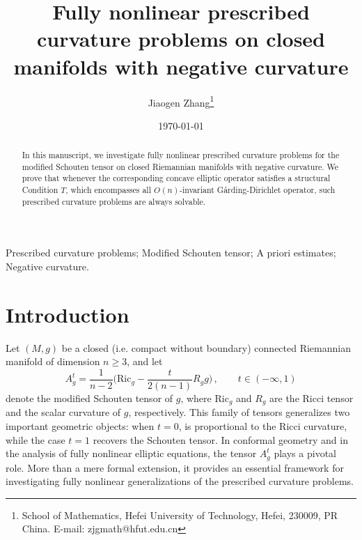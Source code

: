 \documentclass{article}
\providecommand{\keywords}[1]
{
\textbf{\text{Keywords: }} #1
}
\theoremstyle{plain}
\theoremstyle{definition}
\theoremstyle{definition}
\numberwithin{equation}{section}
\begin{document}
\begin{sloppypar}	
\title{Fully nonlinear prescribed curvature problems on closed manifolds with negative curvature}
	
\author{
Jiaogen Zhang\thanks{School of Mathematics,  Hefei University of Technology,  Hefei, 230009, PR China. E-mail: zjgmath@hfut.edu.cn} 
}


\date{\today}
\maketitle


\begin{abstract}
In this manuscript, we  investigate fully nonlinear prescribed curvature problems for the modified Schouten tensor on closed Riemannian manifolds with negative curvature. We prove that whenever the corresponding concave elliptic operator satisfies a structural Condition $T$, which encompasses all $O(n)$-invariant G\r{a}rding-Dirichlet operator, such prescribed curvature problems are always solvable.
\end{abstract}


\keywords{Prescribed curvature problems; Modified Schouten tensor; A priori estimates; Negative curvature.}



\section{Introduction}
Let $(M,g)$ be a closed (i.e. compact without boundary) connected Riemannian manifold of dimension $n \geq 3$, and let
\[
A^{t}_{g}=\frac{1}{n-2}\big( \mathrm{Ric}_{g}-\frac{t}{2(n-1)}R_{g}g\big)\,, \qquad t\in (-\infty,1)
\]
denote the modified Schouten tensor of $g$, where $\mathrm{Ric}_g$ and $R_g$ are the Ricci tensor and the scalar curvature of $g$, respectively. This family of tensors generalizes two important geometric objects: when $t=0$, is proportional to the Ricci curvature, while the case $t=1$ recovers the Schouten tensor. In conformal geometry and in the analysis of fully nonlinear elliptic equations, the tensor $A^{t}_{g}$ plays a pivotal role. More than a mere formal extension, it provides an essential framework for investigating fully nonlinear generalizations of the prescribed curvature problems.\medskip



\end{sloppypar}
\end{document}
